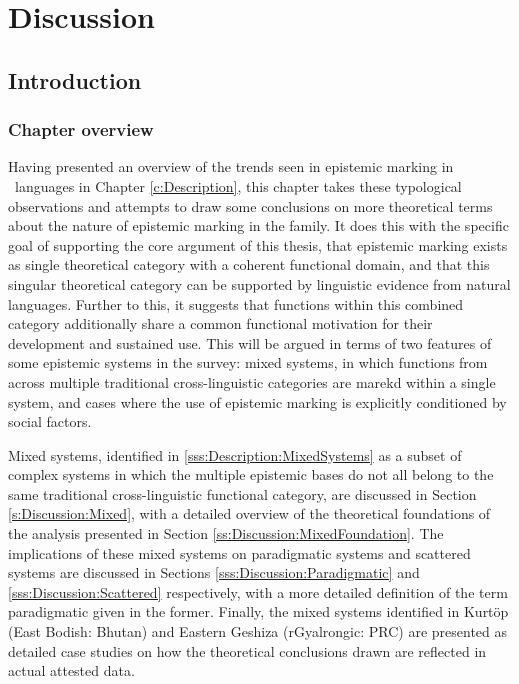 \chapter{Discussion}\label{c:Discussion}
\section{Introduction}\label{s:Discussion:Introduction}
\subsection{Chapter overview}
Having presented an overview of the trends seen in epistemic marking in \lfam\ languages in Chapter \ref{c:Description}, this chapter takes these typological observations and attempts to draw some conclusions on more theoretical terms about the nature of epistemic marking in the family. It does this with the specific goal of supporting the core argument of this thesis, that epistemic marking exists as single theoretical category with a coherent functional domain, and that this singular theoretical category can be supported by linguistic evidence from natural languages. Further to this, it suggests that functions within this combined category additionally share a common functional motivation for their development and sustained use. This will be argued in terms of two features of some epistemic systems in the survey: mixed systems, in which functions from across multiple traditional cross-linguistic categories are marekd within a single system, and cases where the use of epistemic marking is explicitly conditioned by social factors.

Mixed systems, identified in \ref{sss:Description:MixedSystems} as a subset of complex systems in which the multiple epistemic bases do not all belong to the same traditional cross-linguistic functional category, are discussed in Section \ref{s:Discussion:Mixed}, with a detailed overview of the theoretical foundations of the analysis presented in Section \ref{ss:Discussion:MixedFoundation}. The implications of these mixed systems on paradigmatic systems and scattered systems are discussed in Sections \ref{sss:Discussion:Paradigmatic} and \ref{sss:Discussion:Scattered} respectively, with a more detailed definition of the term paradigmatic given in the former. Finally, the mixed systems identified in Kurtöp (East Bodish: Bhutan) and Eastern Geshiza (rGyalrongic: PRC) are presented as detailed case studies on how the theoretical conclusions drawn are reflected in actual attested data.

